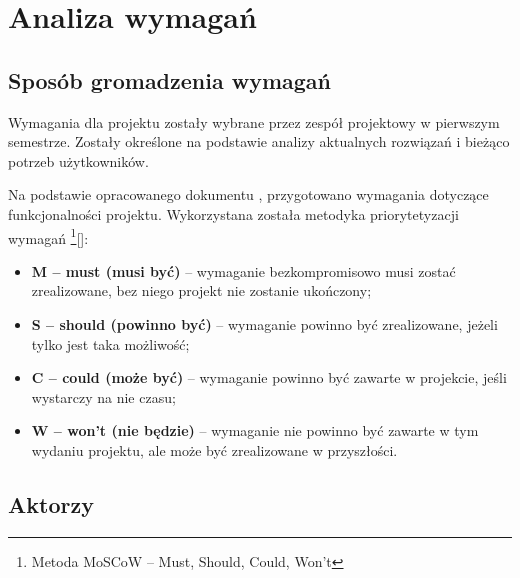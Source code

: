 \newgeometry{} %

\chapter{Analiza wymagań}
\label{ch:analiza-wymagan}

\section{Sposób gromadzenia wymagań}
\label{sec:sposob-gromadzenia-wymagan}

Wymagania dla projektu zostały wybrane przez zespół projektowy w pierwszym semestrze. Zostały określone na podstawie analizy aktualnych rozwiązań i bieżąco potrzeb użytkowników.

Na podstawie opracowanego dokumentu , przygotowano wymagania dotyczące funkcjonalności projektu. \newline Wykorzystana została metodyka priorytetyzacji wymagań \footnote{Metoda MoSCoW – Must, Should, Could, Won't}[]:
\begin{itemize}
    \item \textbf{M – must (musi być)} – wymaganie bezkompromisowo musi zostać zrealizowane, bez niego projekt nie zostanie ukończony;
    \item \textbf{S – should (powinno być)} – wymaganie powinno być zrealizowane, jeżeli tylko jest taka możliwość;
    \item \textbf{C – could (może być)} – wymaganie powinno być zawarte w projekcie, jeśli wystarczy na nie czasu;
    \item \textbf{W – won't (nie będzie)} – wymaganie nie powinno być zawarte w tym wydaniu projektu, ale może być zrealizowane w przyszłości.
\end{itemize}


\section{Aktorzy}
\label{sec:aktorzy}

\begin{stakeholder}[label={tab:stakeholder:someholder1},caption={opis udzialowca}]
    \requ{-----------------}
\end{stakeholder}

